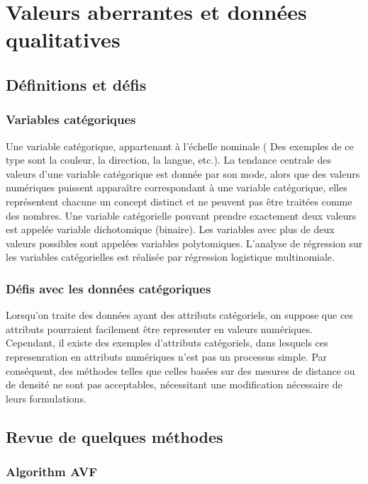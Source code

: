 \section{Valeurs aberrantes et données qualitatives}  \label{Section:3}
%
\subsection{D\'efinitions et défis}
%

\subsubsection*{Variables catégoriques}
Une variable catégorique, appartenant à l’échelle nominale  ( Des exemples de ce type sont la couleur, la direction, la langue, etc.). 
La tendance centrale des valeurs d'une variable catégorique est donnée par son mode, alors que des valeurs numériques puissent apparaître correspondant à une variable catégorique, elles représentent chacune un concept distinct et ne peuvent pas être traitées comme des nombres. 
Une variable catégorielle pouvant prendre exactement deux valeurs est appelée variable dichotomique (binaire). Les variables avec plus de deux valeurs possibles sont appelées variables polytomiques. L'analyse de régression sur les variables catégorielles est réalisée par régression logistique multinomiale.



\subsubsection*{Défis avec les données catégoriques}
Lorsqu'on traite des données ayant des attributs catégoriels, on suppose que ces attributs  pourraient facilement être representer en valeurs numériques. Cependant, il existe des exemples d'attributs catégoriels, dans lesquels ces represenration en attributs numériques n'est pas un processus simple. Par conséquent, des méthodes telles que celles basées sur des mesures de distance ou de densité ne sont pas acceptables, nécessitant une modification nécessaire de leurs formulations.

\subsection{Revue de quelques méthodes}


\subsubsection*{Algorithm AVF}

